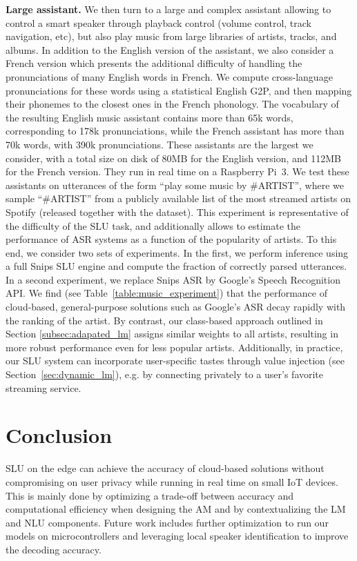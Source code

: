\documentclass{article}
\begin{document}
  \textbf{Large assistant.} We then turn to a large and complex assistant allowing to control a smart speaker through playback control (volume control, track navigation, etc), but also play music from large libraries of artists, tracks, and albums. 
In addition to the English version of the assistant, we also consider a French version which presents the additional difficulty of handling the pronunciations of many English words in French. 
  We compute cross-language pronunciations for these words using a statistical English G2P, and then mapping their phonemes to the closest ones in the French phonology. 
  The vocabulary of the resulting English music assistant contains more than 65k words, corresponding to 178k pronunciations, while the French assistant has more than 70k words, with 390k pronunciations. 
  These assistants are the largest we consider, with a total size on disk of 80MB for the English version, and 112MB for the French version. They run in real time on a Raspberry Pi~3. We test these assistants on utterances of the form ``play some music by \#ARTIST'', where we sample ``\#ARTIST'' from a publicly available list of the most streamed artists on Spotify (released together with the dataset). 
  This experiment is representative of the difficulty of the SLU task, and additionally allows to estimate the performance of ASR systems as a function of the popularity of artists. 
  To this end, we consider two sets of experiments. In the first, we perform inference using a full Snips SLU engine and compute the fraction of correctly parsed utterances. 
  In a second experiment, we replace Snips ASR by Google's Speech Recognition API. 
  We find (see Table~\ref{table:music_experiment}) that the performance of cloud-based, general-purpose solutions such as Google's ASR decay rapidly with the ranking of the artist. 
  By contrast, our class-based approach outlined in Section \ref{subsec:adapated_lm} assigns similar weights to all artists, resulting in more robust performance even for less popular artists. 
  Additionally, in practice, our SLU system can incorporate user-specific tastes through value injection (see Section~\ref{sec:dynamic_lm}), e.g. by connecting privately to a user's favorite streaming service.

\section{Conclusion}
\label{sec:conclusion}
  SLU on the edge can achieve the accuracy of cloud-based solutions without compromising on user privacy while running in real time on small IoT devices. This is mainly done by optimizing a trade-off between accuracy and computational efficiency when designing the AM and by contextualizing the LM and NLU components.
  Future work includes further optimization to run our models on microcontrollers and leveraging local speaker identification to improve the decoding accuracy. 
   \small


\end{document}
